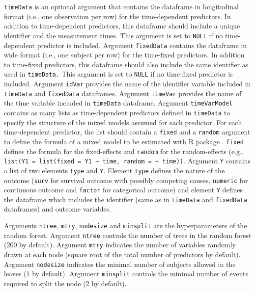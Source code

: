 \texttt{timeData} is an optional argument that contains the dataframe in longitudinal format (i.e., one observation per row) for the time-dependent predictors. In addition to time-dependent predictors, this dataframe should include a unique identifier and the measurement times. This argument is set to \texttt{NULL} if no time-dependent predictor is included. Argument \texttt{fixedData} contains the dataframe in wide format (i.e., one subject per row) for the time-fixed predictors. In addition to time-fixed predictors, this dataframe should also include the same identifier as used in \texttt{timeData.} This argument is set to \texttt{NULL} if no time-fixed predictor is included. Argument \texttt{idVar} provides the name of the identifier variable included in \texttt{timeData} and \texttt{fixedData} dataframes. Argument \texttt{timeVar} provides the name of the time variable included in \texttt{timeData} dataframe. Argument \texttt{timeVarModel} contains as many lists as time-dependent predictors defined in \texttt{timeData} to specify the structure of the mixed models assumed for each predictor. For each time-dependent predictor, the list should contain a \texttt{fixed} and a \texttt{random} argument to define the formula of a mixed model to be estimated with  R package \citep{proust_lima_estimation_2017}. \texttt{fixed} defines the formula for the fixed-effects and \texttt{random} for the random-effects (e.g., \texttt{list(Y1\ =\ list(fixed\ =\ Y1\ \textasciitilde{}\ time,\ random\ =\ \textasciitilde{}\ time))}. Argument \texttt{Y} contains a list of two elements \texttt{type} and \texttt{Y}. Element \texttt{type} defines the nature of the outcome (\texttt{surv} for survival outcome with possibly competing causes, \texttt{numeric} for continuous outcome and \texttt{factor} for categorical outcome) and element \texttt{Y} defines the dataframe which includes the identifier (same as in \texttt{timeData} and \texttt{fixedData} dataframes) and outcome variables.

Arguments \texttt{ntree}, \texttt{mtry}, \texttt{nodesize} and \texttt{minsplit} are the hyperparameters of the random forest. Argument \texttt{ntree} controls the number of trees in the random forest (200 by default). Argument \texttt{mtry} indicates the number of variables randomly drawn at each node (square root of the total number of predictors by default). Argument \texttt{nodesize} indicates the minimal number of subjects allowed in the leaves (1 by default). Argument \texttt{minsplit} controls the minimal number of events required to split the node (2 by default).

